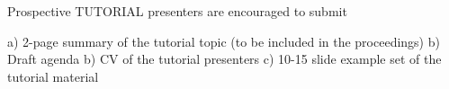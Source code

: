 \documentclass[11pt,twocolumn]{article}
\begin{document}

\cite{Hackystat}

Prospective TUTORIAL presenters are encouraged to submit

    a) 2-page summary of the tutorial topic (to be included in the proceedings)
    b) Draft agenda
    b) CV of the tutorial presenters
    c) 10-15 slide example set of the tutorial material




\end{document}
